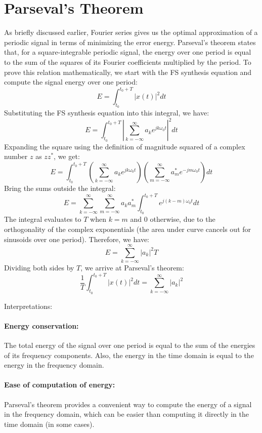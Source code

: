 \section{Parseval's Theorem}
As briefly discussed earlier, Fourier series gives us the optimal approximation of a periodic signal in terms of minimizing the error energy. Parseval's theorem states that, for a square-integrable periodic signal, the energy over one period is equal to the sum of the squares of its Fourier coefficients multiplied by the period. To prove this relation mathematically, we start with the FS synthesis equation and compute the signal energy over one period:
\[
E = \int_{t_0}^{t_0+T} |x(t)|^2 dt
\]
Substituting the FS synthesis equation into this integral, we have:
\[
E = \int_{t_0}^{t_0+T} \left| \sum_{k=-\infty}^{\infty} a_k e^{j k \omega_0 t} \right|^2 dt
\]
Expanding the square using the definition of magnitude squared of a complex number \(z\) as \(z z^*\), we get:
\[
E = \int_{t_0}^{t_0+T} \left( \sum_{k=-\infty}^{\infty} a_k e^{j k \omega_0 t} \right) \left( \sum_{m=-\infty}^{\infty} a_m^* e^{-j m \omega_0 t} \right) dt
\]
Bring the sums outside the integral:
\[
E = \sum_{k=-\infty}^{\infty} \sum_{m=-\infty}^{\infty} a_k a_m^* \int_{t_0}^{t_0+T} e^{j (k - m) \omega_0 t} dt
\]
The integral evaluates to \(T\) when \(k = m\) and \(0\) otherwise, due to the orthogonality of the complex exponentials (the area under curve cancels out for sinusoids over one period). Therefore, we have:
\[
E = \sum_{k=-\infty}^{\infty} |a_k|^2 T
\]
Dividing both sides by \(T\), we arrive at Parseval's theorem:
\[
\frac{1}{T} \int_{t_0}^{t_0+T} |x(t)|^2 dt = \sum_{k=-\infty}^{\infty} |a_k|^2
\]

Interpretations:

\paragraph{Energy conservation:} 

The total energy of the signal over one period is equal to the sum of the energies of its frequency components. Also, the energy in the time domain is equal to the energy in the frequency domain.

\paragraph{Ease of computation of energy:} Parseval's theorem provides a convenient way to compute the energy of a signal in the frequency domain, which can be easier than computing it directly in the time domain (in some cases).

